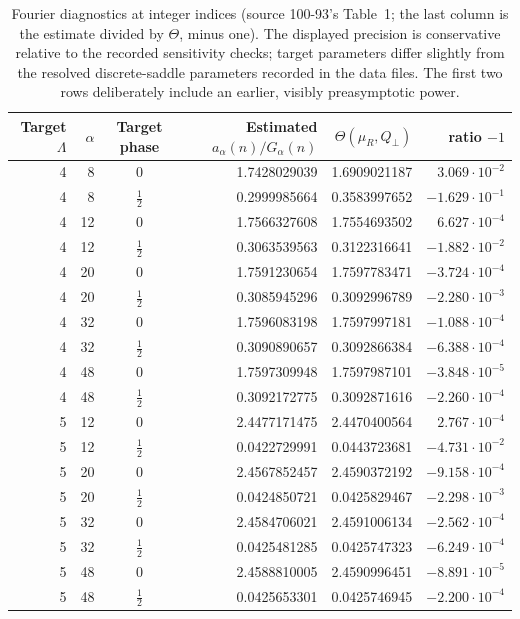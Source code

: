 \documentclass[11pt]{article}
\numberwithin{equation}{section}
\theoremstyle{definition}\newtheorem{definition}[theorem]{Definition}
\theoremstyle{remark}\newtheorem{remark}[theorem]{Remark}
\begin{document}
\begin{table}[!htbp]
\centering\small
\begin{tabular}{rrcrrr}
\toprule
Target $\Lambda$ & $\alpha$ & Target phase & Estimated $a_\alpha(n)/G_\alpha(n)$ & $\Theta(\mu_R,Q_\perp)$ & ratio $-1$\\
\midrule
4 & 8 & $0$ & 1.7428029039 & 1.6909021187 & $3.069\cdot10^{-2}$ \\
4 & 8 & $\frac12$ & 0.2999985664 & 0.3583997652 & $-1.629\cdot10^{-1}$ \\
4 & 12 & $0$ & 1.7566327608 & 1.7554693502 & $6.627\cdot10^{-4}$ \\
4 & 12 & $\frac12$ & 0.3063539563 & 0.3122316641 & $-1.882\cdot10^{-2}$ \\
4 & 20 & $0$ & 1.7591230654 & 1.7597783471 & $-3.724\cdot10^{-4}$ \\
4 & 20 & $\frac12$ & 0.3085945296 & 0.3092996789 & $-2.280\cdot10^{-3}$ \\
4 & 32 & $0$ & 1.7596083198 & 1.7597997181 & $-1.088\cdot10^{-4}$ \\
4 & 32 & $\frac12$ & 0.3090890657 & 0.3092866384 & $-6.388\cdot10^{-4}$ \\
4 & 48 & $0$ & 1.7597309948 & 1.7597987101 & $-3.848\cdot10^{-5}$ \\
4 & 48 & $\frac12$ & 0.3092172775 & 0.3092871616 & $-2.260\cdot10^{-4}$ \\
5 & 12 & $0$ & 2.4477171475 & 2.4470400564 & $2.767\cdot10^{-4}$ \\
5 & 12 & $\frac12$ & 0.0422729991 & 0.0443723681 & $-4.731\cdot10^{-2}$ \\
5 & 20 & $0$ & 2.4567852457 & 2.4590372192 & $-9.158\cdot10^{-4}$ \\
5 & 20 & $\frac12$ & 0.0424850721 & 0.0425829467 & $-2.298\cdot10^{-3}$ \\
5 & 32 & $0$ & 2.4584706021 & 2.4591006134 & $-2.562\cdot10^{-4}$ \\
5 & 32 & $\frac12$ & 0.0425481285 & 0.0425747323 & $-6.249\cdot10^{-4}$ \\
5 & 48 & $0$ & 2.4588810005 & 2.4590996451 & $-8.891\cdot10^{-5}$ \\
5 & 48 & $\frac12$ & 0.0425653301 & 0.0425746945 & $-2.200\cdot10^{-4}$ \\
\bottomrule
\end{tabular}
\caption{Fourier diagnostics at integer indices (source 100-93's Table~1;
the last column is the estimate divided by $\Theta$, minus one).  The
displayed precision is conservative relative to the recorded sensitivity
checks; target parameters differ slightly from the resolved discrete-saddle
parameters recorded in the data files.  The first two rows deliberately
include an earlier, visibly preasymptotic power.}\label{dpn:ct:tab:diagnostics}
\end{table}
\end{document}
